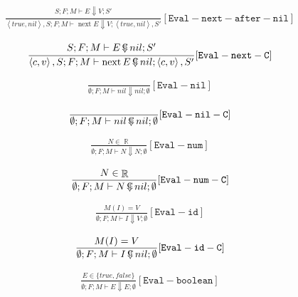 \documentclass{scrartcl}
\DeclareMathOperator{\nextop}{next}
\DeclareMathOperator{\numtype}{\mathbb{R}}
\DeclareMathOperator{\ceval}{\overset{C}{\smash{\Downarrow}}}
\begin{document}
    \begin{align*}
    \frac{
        \begin{matrix}
        S; F; M \vdash E \Downarrow V; S'
        \end{matrix}
    }{
        \left<true, nil \right>, S; F; M \vdash \nextop E  \Downarrow V; \left< true, nil \right>, S'
    }[\mathtt{Eval-next-after-nil}]
    \end{align*}
    
    \begin{align*}
    \frac{
        \begin{matrix}
        S; F; M \vdash E \ceval nil; S'
        \end{matrix}
    }{
        \left<c, v\right>, S; F; M \vdash \nextop E   \ceval nil; \left<c, v\right>, S'
    }[\mathtt{Eval-next-C}]
    \end{align*}
    
    \begin{align*}
    \frac{}{
        \emptyset; F; M \vdash nil \Downarrow nil; \emptyset
    }[\mathtt{Eval-nil}]
    \end{align*}
    
    \begin{align*}
    \frac{}{
        \emptyset; F; M \vdash nil  \ceval nil; \emptyset
    }[\mathtt{Eval-nil-C}]
    \end{align*}
    
    \begin{align*}
    \frac{
        N \in \numtype
    }{
        \emptyset; F; M \vdash N \Downarrow N; \emptyset
    }[\mathtt{Eval-num}]
    \end{align*}
    
    \begin{align*}
    \frac{
        N \in \numtype
    }{
        \emptyset; F; M \vdash N  \ceval nil; \emptyset
    }[\mathtt{Eval-num-C}]
    \end{align*}

    \begin{align*}
    \frac{
        M(I) = V
    }{
        \emptyset; F; M \vdash I \Downarrow V; \emptyset
    }[\mathtt{Eval-id}]
    \end{align*}
    
    \begin{align*}
    \frac{
        M(I) = V
    }{
        \emptyset; F; M \vdash I  \ceval nil; \emptyset
    }[\mathtt{Eval-id-C}]
    \end{align*}
    
    \begin{align*}
    \frac{
        E \in \{true, false\}
    }{
        \emptyset; F; M \vdash E \Downarrow E; \emptyset
    }[\mathtt{Eval-boolean}]
    \end{align*}
    
\end{document}
